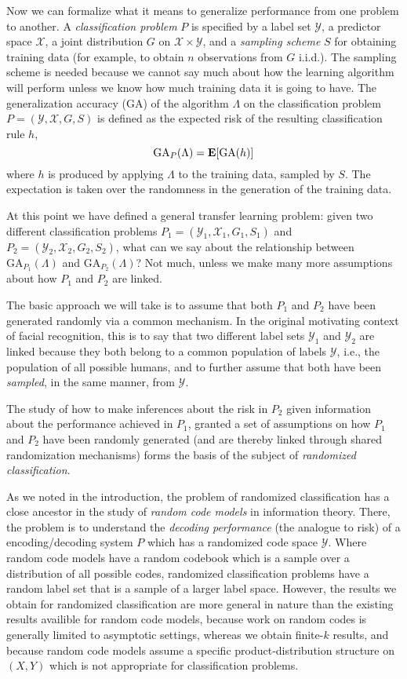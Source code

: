 \documentclass[12pt]{article}
\begin{document}
Now we can formalize what it means to generalize performance from one
problem to another.  A \emph{classification problem} $P$ is specified
by a label set $\mathcal{Y}$, a predictor space $\mathcal{X}$, a joint
distribution $G$ on $\mathcal{X} \times \mathcal{Y}$, and a
\emph{sampling scheme} $S$ for obtaining training data (for example,
to obtain $n$ observations from $G$ i.i.d.).  The sampling scheme is
needed because we cannot say much about how the learning algorithm
will perform unless we know how much training data it is going to
have.  The generalization accuracy (GA) of the algorithm $\Lambda$ on the
classification problem $P = (\mathcal{Y}, \mathcal{X}, G, S)$ is
defined as the expected risk of the resulting classification rule $h$,
\[
\text{GA}_P(\Lambda) = \textbf{E}[\text{GA}(h)]
\]
where $h$ is produced by applying $\Lambda$ to the training data,
sampled by $S$.  The expectation is taken over the randomness in the
generation of the training data.

At this point we have defined a general transfer learning
problem: given two different classification problems $P_1 =
(\mathcal{Y}_1, \mathcal{X}_1, G_1, S_1)$ and $P_2 = (\mathcal{Y}_2,
\mathcal{X}_2, G_2, S_2)$, what can we say about the relationship
between $\text{GA}_{P_1}(\Lambda)$ and $\text{GA}_{P_2}(\Lambda)$?
Not much, unless we make many more assumptions about how $P_1$ and
$P_2$ are linked.

The basic approach we will take is to assume that both $P_1$ and $P_2$
have been generated randomly via a common mechanism.  In the original
motivating context of facial recognition, this is to say that two
different label sets $\mathcal{Y}_1$ and $\mathcal{Y}_2$ are linked
because they both belong to a common population of labels
$\mathcal{Y}$, i.e., the population of all possible humans, and to
further assume that both have been \emph{sampled}, in the same manner,
from $\mathcal{Y}$.

The study of how to make inferences about the risk in $P_2$ given
information about the performance achieved in $P_1$, granted a set of
assumptions on how $P_1$ and $P_2$ have been randomly generated (and
are thereby linked through shared randomization mechanisms) forms the
basis of the subject of \emph{randomized classification}.

As we noted in the introduction, the problem of randomized
classification has a close ancestor in the study of \emph{random code
  models} in information theory.  There, the problem is to understand
the \emph{decoding performance} (the analogue to risk) of a
encoding/decoding system $P$ which has a randomized code space
$\mathcal{Y}$.  Where random code models have a random codebook which
is a sample over a distribution of all possible codes, randomized
classification problems have a random label set that is a sample of a
larger label space.  However, the results we obtain for randomized
classification are more general in nature than the existing results
availible for random code models, because work on random codes is
generally limited to asymptotic settings, whereas we obtain finite-$k$
results, and because random code models assume a specific
product-distribution structure on $(X, Y)$ which is not appropriate
for classification problems.
\end{document}
